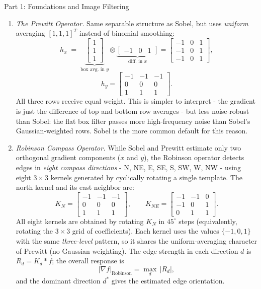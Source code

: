\documentclass[letterpaper]{article}
\begin{document}
\begin{notes}{Part 1: Foundations and Image Filtering}
\begin{enumerate}
    \item \textit{The Prewitt Operator.} Same separable structure as Sobel, but uses \emph{uniform} averaging $[1,1,1]^T$ instead of binomial smoothing:
    $$h_x \;=\; \underbrace{\begin{bmatrix}1\\1\\1\end{bmatrix}}_{\text{box avg.\ in }y} \otimes \underbrace{\begin{bmatrix}-1 & 0 & 1\end{bmatrix}}_{\text{diff.\ in }x} = \begin{bmatrix}-1&0&1\\-1&0&1\\-1&0&1\end{bmatrix},  $$
    $$h_y = \begin{bmatrix}-1&-1&-1\\0&0&0\\1&1&1\end{bmatrix}.$$
    All three rows receive equal weight. This is simpler to interpret - the gradient is just the difference of top and bottom row averages - but less noise-robust than Sobel: the flat box filter passes more high-frequency noise than Sobel's Gaussian-weighted rows. Sobel is the more common default for this reason.

    \item \textit{Robinson Compass Operator.} While Sobel and Prewitt estimate only two orthogonal gradient components ($x$ and $y$), the Robinson operator detects edges in \emph{eight compass directions} - N, NE, E, SE, S, SW, W, NW - using eight $3\times3$ kernels generated by cyclically rotating a single template. The north kernel and its east neighbor are:
    $$K_N = \begin{bmatrix}-1&-1&-1\\0&0&0\\1&1&1\end{bmatrix}, \qquad K_{NE} = \begin{bmatrix}-1&-1&0\\-1&0&1\\0&1&1\end{bmatrix}.$$
    All eight kernels are obtained by rotating $K_N$ in $45^\circ$ steps (equivalently, rotating the $3\times3$ grid of coefficients). Each kernel uses the values $\{-1, 0, 1\}$ with the same \emph{three-level} pattern, so it shares the uniform-averaging character of Prewitt (no Gaussian weighting). The edge strength in each direction $d$ is $R_d = K_d * f$; the overall response is
    $$|\nabla f|_{\text{Robinson}} = \max_{d}\,|R_d|,$$
    and the dominant direction $d^*$ gives the estimated edge orientation.


\end{enumerate}
\end{notes}
\end{document}
